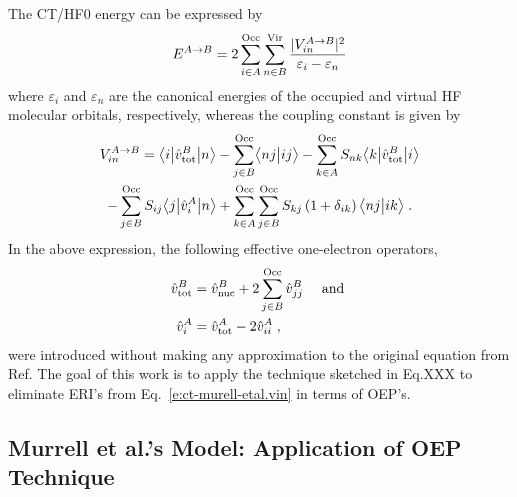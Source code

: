 The CT/HF0 energy can be expressed
by\cite{Murrell.Randic.Williams.Longuet-Higgins.ProcRSocLondA.1965,Otto.Ladik.ChemPhys.1975}
%
\begin{equation} \label{e:ct-murell-etal.e}
 E^{A\rightarrow B} = 2 \sum_{i\in A}^{\rm Occ} \sum_{n\in B}^{\rm Vir} 
  \frac{\vert V^{A\rightarrow B}_{in} \vert^2 }{\varepsilon_i - \varepsilon_n}
\end{equation}
%
%
where $\varepsilon_i$ and $\varepsilon_n$ are the canonical energies
of the occupied and virtual
HF molecular orbitals, respectively,
whereas the coupling constant is given by
%
\begin{multline} \label{e:ct-murell-etal.vin}
 V^{A\rightarrow B}_{in} = 
        \bigl\langle {i} \bigl\lvert {\hat{v}^B_{\rm tot} } \bigl\lvert {n} \bigr\rangle 
      - \sum_{j\in B}^{\rm Occ} \bigl\langle {nj} \bigl\lvert {ij} \bigr\rangle 
      - \sum_{k\in A}^{\rm Occ} S_{nk} \bigl\langle {k} \bigl\lvert {\hat{v}^B_{\rm tot} } \bigl\lvert {i} \bigr\rangle \\
      - \sum_{j\in B}^{\rm Occ} S_{ij} \bigl\langle {j} \bigl\lvert {\hat{v}^A_{i} } \bigl\lvert {n} \bigr\rangle  
     + \sum_{k\in A}^{\rm Occ} \sum_{j\in B}^{\rm Occ}  
        S_{kj} \left(1+\delta_{ik}\right) \bigl\langle {nj} \bigl\lvert {ik} \bigr\rangle \;.
\end{multline}
%
In the above expression, the following effective one\hyp{}electron operators,
%
\begin{subequations} 
\begin{align} \label{e:ct-murell-etal.vtot-vi}
 \hat{v}^B_{\rm tot} &= \hat{v}^B_{\rm nuc} + 2\sum_{j\in B}^{\rm Occ} \hat{v}^B_{jj} \quad\text{ and }\\ 
 \hat{v}^A_{i      } &= \hat{v}^A_{\rm tot} - 2\hat{v}^A_{ii} \;,
\end{align}
\end{subequations}
%
were introduced without making any approximation to the original equation
from Ref. 
The goal of this work is to apply the technique sketched in Eq.XXX
to eliminate ERI's from Eq.~\eqref{e:ct-murell-etal.vin} in terms of OEP's.

\subsection{\label{ss:3.3.OEP} Murrell et al.'s Model: Application of OEP Technique}

